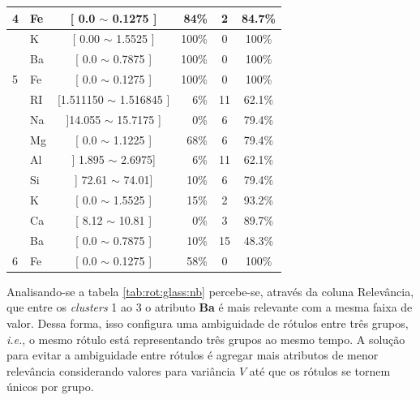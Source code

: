 \begin{table}[!h]
{\begin{tabular}{llcrcc}
\multirow{-5}{*}{4}                          & Fe    & [ 0.0 $\sim$  0.1275 ]    & 84\%  & 2  & 84.7\% \\  \hline                                            
                                            & K     & [ 0.00 $\sim$ 1.5525 ]     & 100\%  & 0 & 100\% \\ 
                                            & Ba     & [ 0.0 $\sim$  0.7875 ]    & 100\%  & 0 & 100\% \\  
\multirow{-3}{*}{5}                         & Fe    & [ 0.0 $\sim$  0.1275 ]     & 100\%  & 0 & 100\% \\  \hline
                                            & RI     & [1.511150 $\sim$  1.516845 ] & 6\%  & 11  & 62.1\% \\ 
                                            & Na     & ]14.055 $\sim$  15.7175 ] & 0\%  & 6  & 79.4\% \\ 
                                             & Mg    & [ 0.0 $\sim$  1.1225 ]    & 68\%  &6  & 79.4\%\\ 
                                             & Al    & ] 1.895 $\sim$  2.6975]      & 6\%  & 11  & 62.1\%\\
                                            & Si    & ] 72.61 $\sim$  74.01]      & 10\%  & 6  & 79.4\%\\
                                            & K     & [  0.0 $\sim$  1.5525 ]    & 15\%  & 2  & 93.2\% \\ 
                                            & Ca     & [ 8.12 $\sim$ 10.81 ]    & 0\%  & 3  & 89.7\% \\ 
                                            & Ba     & [ 0.0 $\sim$  0.7875 ]    & 10\%  & 15  & 48.3\% \\  
\multirow{-3}{*}{6}                         & Fe    & [ 0.0 $\sim$  0.1275 ]     & 58\%  & 0  & 100\% \\  \hline

\end{tabular}
}
\end{table}



Analisando-se a tabela \ref{tab:rot:glass:nb} percebe-se, através da coluna Relevância, que entre os \textit{clusters} 1 ao 3 o atributo \textbf{Ba} é mais relevante com a mesma faixa de valor. Dessa forma, isso configura uma ambiguidade de rótulos entre três grupos, \textit{i.e.}, o mesmo rótulo está representando três grupos ao mesmo tempo. A solução para evitar a ambiguidade entre rótulos é agregar mais atributos de menor relevância considerando valores para variância ${V}$ até que os rótulos se tornem únicos por grupo. 

